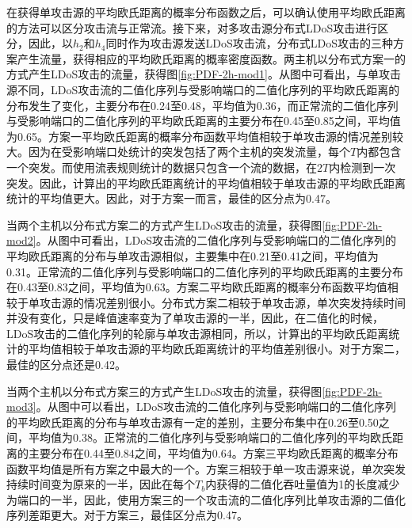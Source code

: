 
在获得单攻击源的平均欧氏距离的概率分布函数之后，可以确认使用平均欧氏距离的方法可以区分攻击流与正常流。接下来，对多攻击源分布式LDoS攻击进行区分，因此，以$h_2$和$h_4$同时作为攻击源发送LDoS攻击流，分布式LDoS攻击的三种方案产生流量，获得相应的平均欧氏距离的概率密度函数。两主机以分布式方案一的方式产生LDoS攻击的流量，获得图\ref{fig:PDF-2h-mod1}。从图中可看出，与单攻击源不同，LDoS攻击流的二值化序列与受影响端口的二值化序列的平均欧氏距离的分布发生了变化，主要分布在0.24至0.48，平均值为0.36，而正常流的二值化序列与受影响端口的二值化序列的平均欧氏距离的主要分布在0.45至0.85之间，平均值为0.65。方案一平均欧氏距离的概率分布函数平均值相较于单攻击源的情况差别较大。因为在受影响端口处统计的突发包括了两个主机的突发流量，每个$T$内都包含一个突发。而使用流表规则统计的数据只包含一个流的数据，在$2T$内检测到一次突发。因此，计算出的平均欧氏距离统计的平均值相较于单攻击源的平均欧氏距离统计的平均值更大。因此，对于方案一而言，最佳的区分点为0.47。

当两个主机以分布式方案二的方式产生LDoS攻击的流量，获得图\ref{fig:PDF-2h-mod2}。从图中可看出，LDoS攻击流的二值化序列与受影响端口的二值化序列的平均欧氏距离的分布与单攻击源相似，主要集中在0.21至0.41之间，平均值为0.31。正常流的二值化序列与受影响端口的二值化序列的平均欧氏距离的主要分布在0.43至0.83之间，平均值为0.63。方案二平均欧氏距离的概率分布函数平均值相较于单攻击源的情况差别很小。分布式方案二相较于单攻击源，单次突发持续时间并没有变化，只是峰值速率变为了单攻击源的一半，因此，在二值化的时候，LDoS攻击的二值化序列的轮廓与单攻击源相同，所以，计算出的平均欧氏距离统计的平均值相较于单攻击源的平均欧氏距离统计的平均值差别很小。对于方案二，最佳的区分点还是0.42。

当两个主机以分布式方案三的方式产生LDoS攻击的流量，获得图\ref{fig:PDF-2h-mod3}。从图中可以看出，LDoS攻击流的二值化序列与受影响端口的二值化序列的平均欧氏距离的分布与单攻击源有一定的差别，主要分布集中在0.26至0.50之间，平均值为0.38。正常流的二值化序列与受影响端口的二值化序列的平均欧氏距离的主要分布在0.44至0.84之间，平均值为0.64。方案三平均欧氏距离的概率分布函数平均值是所有方案之中最大的一个。方案三相较于单一攻击源来说，单次突发持续时间变为原来的一半，因此在每个$T_b$内获得的二值化吞吐量值为1的长度减少为端口的一半，因此，使用方案三的一个攻击流的二值化序列比单攻击源的二值化序列差距更大。对于方案三，最佳区分点为0.47。

